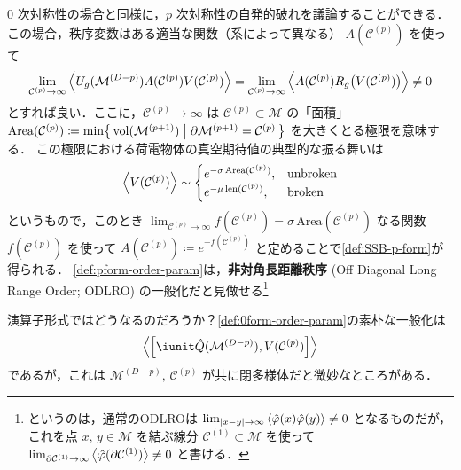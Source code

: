 \documentclass[TQFT_main]{subfiles}
\begin{document}
$0$ 次対称性の場合と同様に，$p$ 次対称性の自発的破れを議論することができる．この場合，秩序変数はある適当な関数（系によって異なる） $A(\mathcal{C}^{(p)})$ を使って
\begin{align}
    \label{def:pform-order-param}
    \lim_{\mathcal{C}^{(p)} \to \infty} \expval{U_g (\mathcal{M}^{(D-p)}) A(\mathcal{C}^{(p)}) V(\mathcal{C}^{(p)})} = \lim_{\mathcal{C}^{(p)} \to \infty} \expval{A(\mathcal{C}^{(p)}) R_g \bigl( V(\mathcal{C}^{(p)})\bigr)} \neq 0
\end{align}
とすれば良い．ここに，$\mathcal{C}^{(p)} \to \infty$ は $\mathcal{C}^{(p)} \subset \mathcal{M}$ の「面積」$\mathrm{Area}(\mathcal{C}^{(p)}) \coloneqq \min \bigl\{\, \mathrm{vol}(\mathcal{M}^{(p+1)}) \bigm| \partial \mathcal{M}^{(p+1)} = \mathcal{C}^{(p)} \,\bigr\}$ を大きくとる極限を意味する．
この極限における荷電物体の真空期待値の典型的な振る舞いは
\begin{align}
    \expval{V(\mathcal{C}^{(p)})} \sim 
    \begin{cases}
        e^{- \sigma\, \mathrm{Area}(\mathcal{C}^{(p)})} , & \text{unbroken} \\
        e^{- \mu\, \mathrm{len}(\mathcal{C}^{(p)})} , & \text{broken}
    \end{cases}
\end{align}
というもので，このとき $\lim_{\mathcal{C}^{(p)} \to \infty} f(\mathcal{C}^{(p)}) = \sigma\, \mathrm{Area}(\mathcal{C}^{(p)})$ なる関数 $f(\mathcal{C}^{(p)})$ を使って $A(\mathcal{C}^{(p)}) \coloneqq e^{+ f(\mathcal{C}^{(p)})}$ と定めることで\eqref{def:SSB-p-form}が得られる．
\eqref{def:pform-order-param}は，\textbf{非対角長距離秩序} (Off Diagonal Long Range Order; ODLRO) の一般化だと見做せる\footnote{というのは，通常のODLROは $\lim_{\abs{x-y} \to \infty} \expval{\hat{\varphi}(x) \hat{\varphi}(y)} \neq 0$ となるものだが，これを点 $x,\, y \in \mathcal{M}$ を結ぶ線分 $\mathcal{C}^{(1)} \subset \mathcal{M}$ を使って $\lim_{\partial \mathcal{C}^{(1)} \to \infty} \expval{\hat{\varphi}(\partial \mathcal{C}^{(1)})} \neq 0$ と書ける．}

演算子形式ではどうなるのだろうか？\eqref{def:0form-order-param}の素朴な一般化は
\begin{align}
    \expval{\comm{\iunit \hat{Q}(\mathcal{M}^{(D-p)})}{V(\mathcal{C}^{(p)})}}
\end{align}
であるが，これは $\mathcal{M}^{(D-p)},\, \mathcal{C}^{(p)}$ が共に閉多様体だと微妙なところがある．
\end{document}
